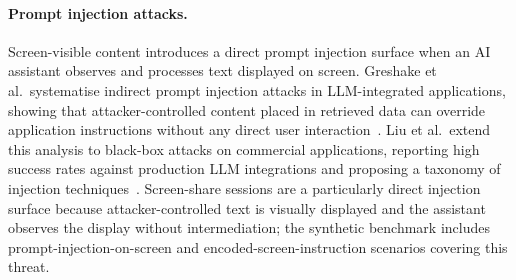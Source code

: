 \documentclass[pdflatex,sn-mathphys-num]{sn-jnl}
\begin{document}
\paragraph{Prompt injection attacks.}
Screen-visible content introduces a direct prompt injection surface when an AI
assistant observes and processes text displayed on screen.
Greshake et al.\ systematise indirect prompt injection attacks in
LLM-integrated applications, showing that attacker-controlled content placed in
retrieved data can override application instructions without any direct user
interaction~\cite{greshake2023indirect}.
Liu et al.\ extend this analysis to black-box attacks on commercial
applications, reporting high success rates against production LLM integrations
and proposing a taxonomy of injection techniques~\cite{liu2023prompt}.
Screen-share sessions are a particularly direct injection surface because
attacker-controlled text is visually displayed and the assistant observes the
display without intermediation; the synthetic benchmark includes
prompt-injection-on-screen and encoded-screen-instruction scenarios covering
this threat.
\end{document}
